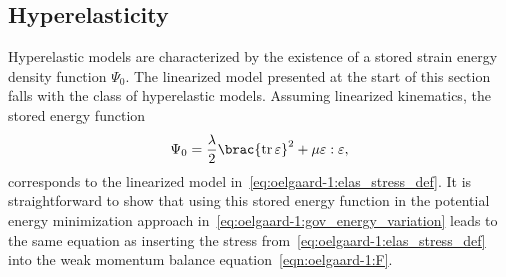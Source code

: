 \subsection{Hyperelasticity}
\label{sec:oelgaard-1:hyperelasticity}

Hyperelastic models are characterized by the existence of a stored
strain energy density function $\Psi_{0}$. The linearized model presented at
the start of this section falls with the class of hyperelastic models.
Assuming linearized kinematics, the stored energy function
%
\begin{equation}
\label{eq:oelgaard-1:hyp_small_strain_energy}
\Psi_{0} = \frac{\lambda}{2} \brac{{\rm tr} \, \varepsilon}^{2} +
       \mu \varepsilon:\varepsilon,
\end{equation}
%
corresponds to the linearized model
in~\eqref{eq:oelgaard-1:elas_stress_def}.  It is straightforward to
show that using this stored energy function in the potential energy
minimization approach in~\eqref{eq:oelgaard-1:gov_energy_variation}
leads to the same equation as inserting the stress
from~\eqref{eq:oelgaard-1:elas_stress_def} into the weak momentum balance
equation~\eqref{eqn:oelgaard-1:F}.

